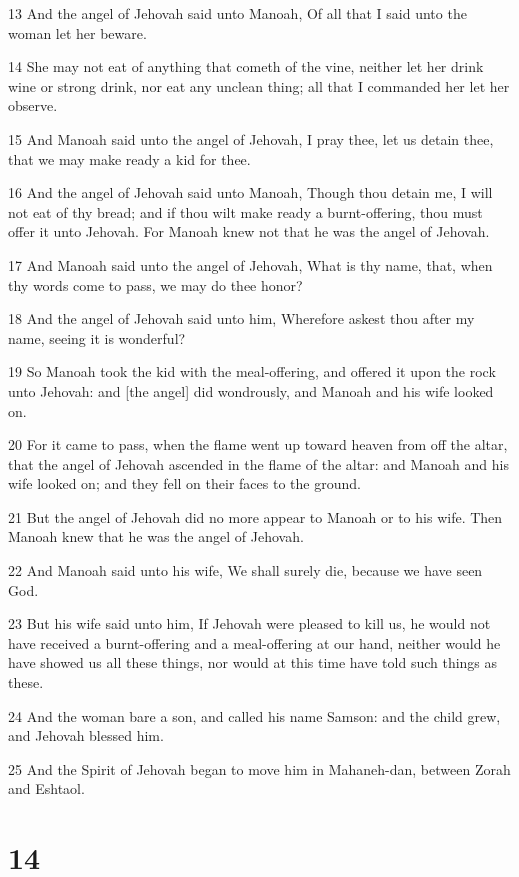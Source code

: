 \par 13 And the angel of Jehovah said unto Manoah, Of all that I said unto the woman let her beware.
\par 14 She may not eat of anything that cometh of the vine, neither let her drink wine or strong drink, nor eat any unclean thing; all that I commanded her let her observe.
\par 15 And Manoah said unto the angel of Jehovah, I pray thee, let us detain thee, that we may make ready a kid for thee.
\par 16 And the angel of Jehovah said unto Manoah, Though thou detain me, I will not eat of thy bread; and if thou wilt make ready a burnt-offering, thou must offer it unto Jehovah. For Manoah knew not that he was the angel of Jehovah.
\par 17 And Manoah said unto the angel of Jehovah, What is thy name, that, when thy words come to pass, we may do thee honor?
\par 18 And the angel of Jehovah said unto him, Wherefore askest thou after my name, seeing it is wonderful?
\par 19 So Manoah took the kid with the meal-offering, and offered it upon the rock unto Jehovah: and [the angel] did wondrously, and Manoah and his wife looked on.
\par 20 For it came to pass, when the flame went up toward heaven from off the altar, that the angel of Jehovah ascended in the flame of the altar: and Manoah and his wife looked on; and they fell on their faces to the ground.
\par 21 But the angel of Jehovah did no more appear to Manoah or to his wife. Then Manoah knew that he was the angel of Jehovah.
\par 22 And Manoah said unto his wife, We shall surely die, because we have seen God.
\par 23 But his wife said unto him, If Jehovah were pleased to kill us, he would not have received a burnt-offering and a meal-offering at our hand, neither would he have showed us all these things, nor would at this time have told such things as these.
\par 24 And the woman bare a son, and called his name Samson: and the child grew, and Jehovah blessed him.
\par 25 And the Spirit of Jehovah began to move him in Mahaneh-dan, between Zorah and Eshtaol.

\chapter{14}

